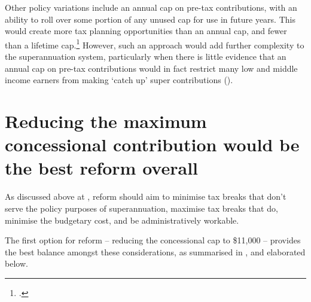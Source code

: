 Other policy variations include an annual cap on pre-tax contributions, with an ability to roll over some portion of any unused cap for use in future years. This would create more tax planning opportunities than an annual cap, and fewer than a lifetime cap.\footcite[][18]{Mercer2015SubmissionToReThink}  However, such an approach would add further complexity to the superannuation system, particularly when there is little evidence that an annual cap on pre-tax contributions would in fact restrict many low and middle income earners from making ‘catch up’ super contributions ().

\section{Reducing the maximum concessional contribution would be the best reform overall\label{sec:SUPER-4-6}}
As discussed above at , reform should aim to minimise tax breaks that don’t serve the policy purposes of superannuation, maximise tax breaks that do, minimise the budgetary cost, and be administratively workable.


The first option for reform – reducing the concessional cap to \$11,000 – provides the best balance amongst these considerations, as summarised in , and elaborated below.

